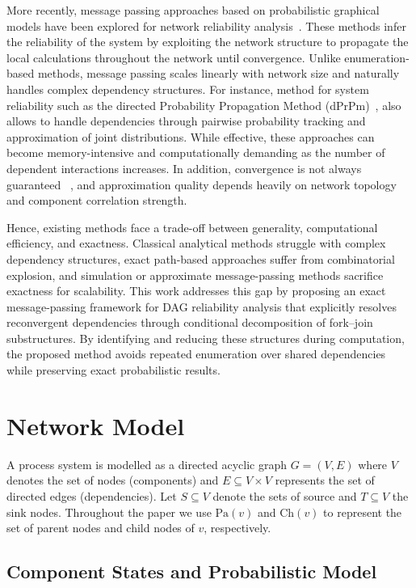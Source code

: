 \documentclass[preprint,12pt]{elsarticle}
\begin{document}
More recently, message passing approaches based on probabilistic graphical models have been explored for network reliability analysis~\cite{yedidia_understanding_2003,pearl_probabilistic_1988}. These methods  infer the reliability of the system by exploiting the network structure to propagate the local calculations throughout the network until convergence. Unlike enumeration-based methods, message passing scales linearly with network size and naturally handles complex dependency structures. For instance, method for system reliability such as the directed Probability Propagation Method (dPrPm)~\cite{tong_probability_2019}, also allows to handle dependencies through pairwise probability tracking and approximation of joint distributions. While effective, these approaches can become memory-intensive and computationally demanding as the number of dependent interactions increases. In addition, convergence is not always guaranteed ~\cite{murphy_loopy_2013}, and approximation quality depends heavily on network topology and component correlation strength.

Hence, existing methods face a trade-off between generality, computational efficiency, and exactness. Classical analytical methods struggle with complex dependency structures, exact path-based approaches suffer from combinatorial explosion, and simulation or approximate message-passing methods sacrifice exactness for scalability. This work addresses this gap by proposing an exact message-passing framework for DAG reliability analysis that explicitly resolves reconvergent dependencies through conditional decomposition of fork--join substructures. By identifying and reducing these structures during computation, the proposed method avoids repeated enumeration over shared dependencies while preserving exact probabilistic results.

\section{Network Model }
A process system is modelled as a directed acyclic graph $G = (V, E)$ where $V$ denotes the set of nodes (components) and $E \subseteq V \times V$ represents the set of directed edges (dependencies). Let $S \subseteq V$ denote the sets of source and  $T \subseteq V$ the sink nodes.
Throughout the paper we use $\text{Pa}(v)$ and $\text{Ch}(v)$ to represent the set of parent nodes and child nodes of $v$, respectively.

\subsection{Component States and Probabilistic Model}
\end{document}
